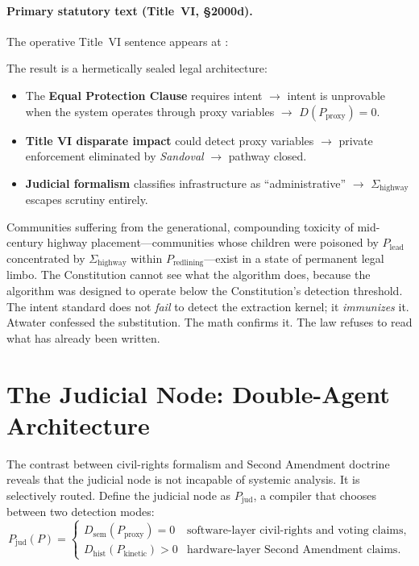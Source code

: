 \paragraph{Primary statutory text (Title~VI, \S2000d).}
The operative Title~VI sentence appears at :

The result is a hermetically sealed legal architecture:
\begin{itemize}
\tightlist
\item The \textbf{Equal Protection Clause} requires intent $\rightarrow$ intent is unprovable when the system operates through proxy variables $\rightarrow$ $D(P_{\text{proxy}}) = 0$.
\item \textbf{Title VI disparate impact} could detect proxy variables $\rightarrow$ private enforcement eliminated by \textit{Sandoval} $\rightarrow$ pathway closed.
\item \textbf{Judicial formalism} classifies infrastructure as ``administrative'' $\rightarrow$ $\Sigma_{\text{highway}}$ escapes scrutiny entirely.
\end{itemize}

Communities suffering from the generational, compounding toxicity of mid-century highway placement---communities whose children were poisoned by $P_{\text{lead}}$ concentrated by $\Sigma_{\text{highway}}$ within $P_{\text{redlining}}$---exist in a state of permanent legal limbo. The Constitution cannot see what the algorithm does, because the algorithm was designed to operate below the Constitution's detection threshold. The intent standard does not \textit{fail} to detect the extraction kernel; it \textit{immunizes} it. Atwater confessed the substitution. The math confirms it. The law refuses to read what has already been written.

\section{The Judicial Node: Double-Agent Architecture}

The contrast between civil-rights formalism and Second Amendment doctrine reveals that the judicial node is not incapable of systemic analysis. It is selectively routed. Define the judicial node as $P_{\text{jud}}$, a compiler that chooses between two detection modes:
\begin{equation}\label{eq:12.4a-judicial-double-agent}
P_{\text{jud}}(P)=
\begin{cases}
D_{\text{sem}}(P_{\text{proxy}})=0 & \text{software-layer civil-rights and voting claims},\\
D_{\text{hist}}(P_{\text{kinetic}})>0 & \text{hardware-layer Second Amendment claims}.
\end{cases}
\end{equation}

